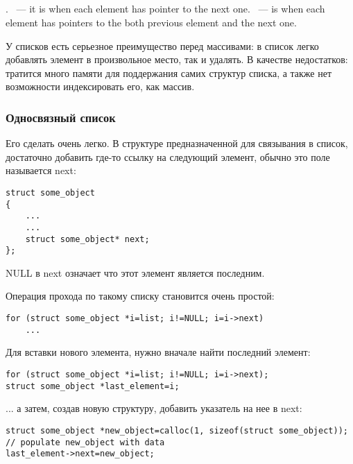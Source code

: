 \subsection{}

.
 ~--- 
{it is when each element has pointer to the next one}.
 ~--- 
{is when each element has pointers to the both previous element and the next one}.

У списков есть серьезное преимущество перед массивами: в список легко добавлять элемент в произвольное место,
так и удалять. В качестве недостатков: тратится много памяти для поддержания самих структур списка, а также
нет возможности индексировать его, как массив.

\subsubsection{Односвязный список}

Его сделать очень легко. В структуре предназначенной для связывания в список, достаточно добавить где-то
ссылку на следующий элемент, обычно это поле называется next:

\begin{lstlisting}
struct some_object
{
	...
	...
	struct some_object* next;
};
\end{lstlisting}

NULL в next означает что этот элемент является последним.

Операция прохода по такому списку становится очень простой:

\begin{lstlisting}
for (struct some_object *i=list; i!=NULL; i=i->next)
	...
\end{lstlisting}

Для вставки нового элемента, нужно вначале найти последний элемент:

\begin{lstlisting}
for (struct some_object *i=list; i!=NULL; i=i->next);
struct some_object *last_element=i;
\end{lstlisting}

... а затем, создав новую структуру, добавить указатель на нее в next:

\begin{lstlisting}
struct some_object *new_object=calloc(1, sizeof(struct some_object));
// populate new_object with data
last_element->next=new_object;
\end{lstlisting}

